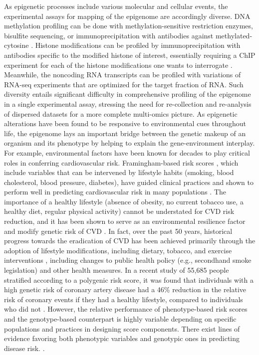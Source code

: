 \documentclass[letter]{bioinfo}
\begin{document}
	As epigenetic processes include various molecular and cellular events, the experimental assays for mapping of the epigenome are accordingly diverse. DNA methylation profiling can be done with methylation-sensitive restriction enzymes, bisulfite sequencing, or immunoprecipitation with antibodies against methylated-cytosine \citep{Bibikova:2010:Genomewide}. Histone modifications can be profiled by immunoprecipitation with antibodies specific to the modified histone of interest, essentially requiring a ChIP experiment for each of the histone modifications one wants to interrogate \citep{Kimura:2013:Histone}. Meanwhile, the noncoding RNA transcripts can be profiled with variations of RNA-seq experiments that are optimized for the target fraction of RNA. Such diversity entails significant difficulty in comprehensive profiling of the epigenome in a single experimental assay, stressing the need for re-collection and re-analysis of dispersed datasets for a more complete multi-omics picture. As epigenetic alterations have been found to be responsive to environmental cues throughout life, the epigenome lays an important bridge between the genetic makeup of an organism and its phenotype by helping to explain the gene-environment interplay.
	For example, environmental factors have been known for decades to play critical roles in conferring cardiovascular risk. Framingham-based risk scores \citep{Sheridan:2003:Framinghambased}, which include variables that can be intervened by lifestyle habits (smoking, blood cholesterol, blood pressure, diabetes), have guided clinical practices \citep{British:1998:Joint} and shown to perform well in predicting cardiovascular risk in many populations \citep{Knuiman:1997:Prediction,Eichler:2007:Prediction}. The importance of a healthy lifestyle (absence of obesity, no current tobacco use, a healthy diet, regular physical activity) cannot be understated for CVD risk reduction, and it has been shown to serve as an environmental resilience factor and modify genetic risk of CVD \citep{Leopold:2018:Emerging}.  In fact, over the past 50 years, historical progress towards the eradication of CVD has been achieved primarily through the adoption of lifestyle modifications, including dietary, tobacco, and exercise interventions \citep{Leopold:2018:Emerging}, including changes to public health policy (e.g., secondhand smoke legislation) and other health measures.  In a recent study of 55,685 people stratified according to a polygenic risk score, it was found that individuals with a high genetic risk of coronary artery disease had a 46\% reduction in the relative risk of coronary events if they had a healthy lifestyle, compared to individuals who did not \citep{Khera:2016:Genetic}.  However, the relative performance of phenotype-based risk scores and the genotype-based counterpart is highly variable depending on specific populations and practices in designing score components. There exist lines of evidence favoring both phenotypic variables \citep{Talmud:2010:Utility} and genotypic ones in predicting disease risk. \citep{DAgostino:2001:Validation,Empana:2003:Are,Eichler:2007:Prediction,Zomer:2014:Cardiovascular}.
\end{document}
